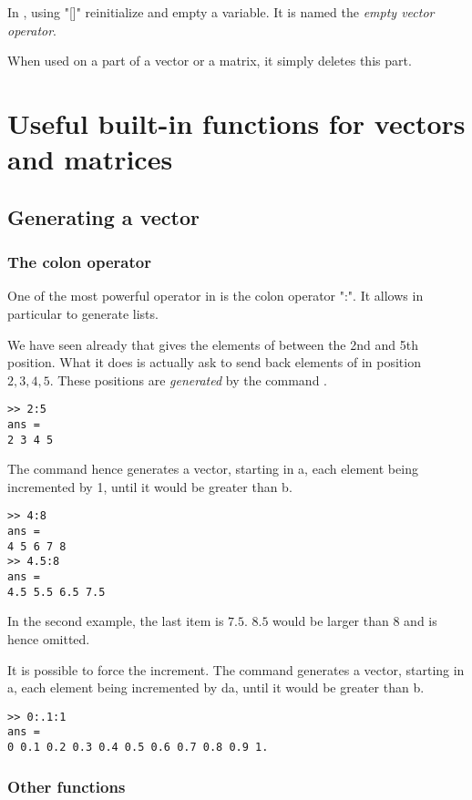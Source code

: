 In \matlab, using "[]" reinitialize and empty a variable. It is named the \emph{empty vector operator}.
	
	When used on a part of a vector or a matrix, it simply deletes this part.





\section{Useful built-in functions for vectors and matrices}
\subsection{Generating a vector}

\subsubsection{The colon operator}
\label{sssec-colon}
One of the most powerful operator in \matlab is the colon operator ":".
It allows in particular to generate lists.

We have seen already that  gives the elements of  between the 2nd and 5th position.
What it does is actually ask \matlab to send back elements of  in position $2,3,4,5$.
These positions are \emph{generated} by the command .
\begin{lstlisting}
>> 2:5
ans = 
2 3 4 5
\end{lstlisting}

The command  hence generates a vector, starting in a, each element being incremented by 1, until it would be greater than b.
\begin{lstlisting}
>> 4:8
ans = 
4 5 6 7 8
>> 4.5:8
ans = 
4.5 5.5 6.5 7.5
\end{lstlisting}
In the second example, the last item is $7.5$. $8.5$ would be larger than $8$ and is hence omitted.

It is possible to force the increment. 
The command  generates a vector, starting in a, each element being incremented by da, until it would be greater than b.
\begin{lstlisting}
>> 0:.1:1
ans = 
0 0.1 0.2 0.3 0.4 0.5 0.6 0.7 0.8 0.9 1.
\end{lstlisting}

\subsubsection{Other functions}

